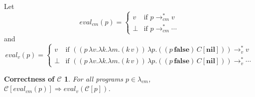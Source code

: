 \documentclass[ms,electronic,twosidetoc,letterpaper,chaptercenter,parttop]{byumsphd}
\begin{document}
Let
\[
eval_{cm}(p)=\begin{cases}
v     &\text{if $p\rightarrow_{cm}^{*}v$}\\
\perp &\text{if $p\rightarrow_{cm}^{*}\cdots$}
\end{cases}
\]
and
\[
eval_{v}(p)=\begin{cases}
v     &\text{if $((p\,\lambda v.\lambda k.\lambda m.(k\,v))\,\lambda p.((p\,\textbf{false})\,C[\textbf{nil}]))\rightarrow_{v}^{*}v$}\\
\perp &\text{if $((p\,\lambda v.\lambda k.\lambda m.(k\,v))\,\lambda p.((p\,\textbf{false})\,C[\textbf{nil}]))\rightarrow_{v}^{*}\cdots$}
\end{cases}
\]

\newtheorem{theorem}{Theorem}
\newtheorem{case}{Case}

\newtheorem*{maintheorem}{Correctness of $\mathcal{C}$}
\begin{maintheorem}
For all programs $p\in\lambda_{cm}$, $\mathcal{C}[eval_{cm}(p)]\Rightarrow eval_{v}(\mathcal{C}[p])$.
\end{maintheorem}
\end{document}

